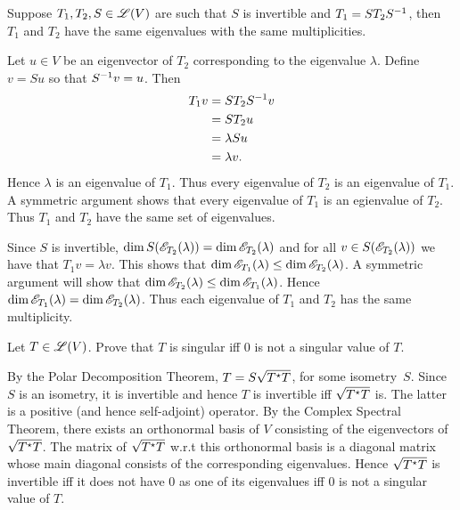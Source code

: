 \begin{exercise}
Suppose $T_1, T_2, S \in \mathscr{L}(V)$ are such that $S$ is invertible and
$T_1 = S T_2 S^{-1}$, then $T_1$ and $T_2$ have the same eigenvalues with the
same multiplicities.
\end{exercise}
\begin{solution}
Let $u \in V$ be an eigenvector of $T_2$ corresponding to the eigenvalue $\lambda$.
Define $v = S u$ so that $S^{-1} v = u$. Then
\begin{align*}
    T_1 v & = S T_2 S^{-1} v \\
          & = S T_2 u \\
          & = \lambda S u \\
          & = \lambda v.
\end{align*}
Hence $\lambda$ is an eigenvalue of $T_1$. Thus every eigenvalue of $T_2$ is an
eigenvalue of $T_1$. A symmetric argument shows that every eigenvalue of $T_1$
is an egienvalue of $T_2$. Thus $T_1$ and $T_2$ have the same set of eigenvalues.

Since $S$ is invertible,
$\dim S (\mathscr{E}_{T_2}(\lambda)) = \dim \mathscr{E}_{T_2}(\lambda)$ and for all
$v \in S ( \mathscr{E}_{T_2}(\lambda) )$ we have that $T_1 v = \lambda v$. This shows
that $\dim \mathscr{E}_{T_1}(\lambda) \leq \dim \mathscr{E}_{T_2}(\lambda)$.
A symmetric argument will show that
$\dim \mathscr{E}_{T_2}(\lambda) \leq \dim \mathscr{E}_{T_1}(\lambda)$. Hence
$\dim \mathscr{E}_{T_1}(\lambda) = \dim \mathscr{E}_{T_2}(\lambda)$. Thus each
eigenvalue of $T_1$ and $T_2$ has the same multiplicity.
\end{solution}

\begin{exercise}
Let $T \in \mathscr{L}(V)$. Prove that $T$ is singular iff $0$ is not a singular
value of $T$.
\end{exercise}
\begin{solution}
By the Polar Decomposition Theorem, $T = S \sqrt{T^{\star} T}$, for some isometry~$S$.
Since $S$ is an isometry, it is invertible and hence $T$ is invertible iff
$\sqrt{T^{\star} T}$ is. The latter is a positive (and hence self-adjoint) operator.
By the Complex Spectral Theorem, there exists an orthonormal basis of $V$
consisting of the eigenvectors of $\sqrt{T^{\star} T}$. The matrix of
$\sqrt{T^{\star} T}$ w.r.t this orthonormal basis is a diagonal matrix whose main
diagonal consists of the corresponding eigenvalues. Hence $\sqrt{T^{\star} T}$
is invertible iff it does not have $0$ as one of its eigenvalues iff
$0$ is not a singular value of $T$.
\end{solution}

